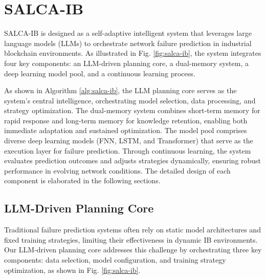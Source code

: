 \documentclass[conference]{IEEEtran}
\begin{document}

%
%
%
%


\section{SALCA-IB}

SALCA-IB is designed as a self-adaptive intelligent system that leverages large language models (LLMs) to orchestrate network failure prediction in industrial blockchain environments. As illustrated in Fig. \ref{fig:salca-ib}, the system integrates four key components: an LLM-driven planning core, a dual-memory system, a deep learning model pool, and a continuous learning process.

As shown in Algorithm \ref{alg:salca-ib}, the LLM planning core serves as the system's central intelligence, orchestrating model selection, data processing, and strategy optimization. The dual-memory system combines short-term memory for rapid response and long-term memory for knowledge retention, enabling both immediate adaptation and sustained optimization. The model pool comprises diverse deep learning models (FNN, LSTM, and Transformer) that serve as the execution layer for failure prediction. Through continuous learning, the system evaluates prediction outcomes and adjusts strategies dynamically, ensuring robust performance in evolving network conditions. The detailed design of each component is elaborated in the following sections.

\subsection{LLM-Driven Planning Core}
Traditional failure prediction systems often rely on static model architectures and fixed training strategies, limiting their effectiveness in dynamic IB environments. Our LLM-driven planning core addresses this challenge by orchestrating three key components: data selection, model configuration, and training strategy optimization, as shown in Fig. \ref{fig:salca-ib}.
\end{document}

